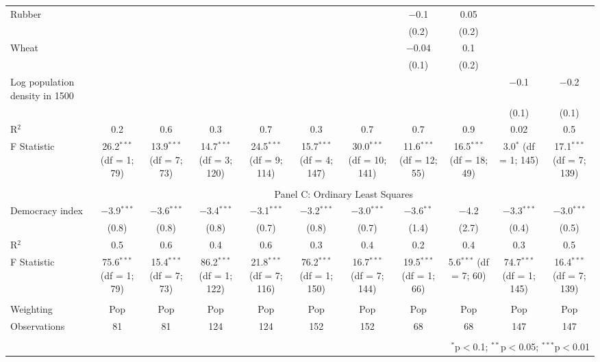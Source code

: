 {\begin{table}[]
\begin{threeparttable}
\begin{tabular}{@{\extracolsep{0pt}}lcccccccccc}
  Rubber &  &  &  &  &  &  & $-$0.1 & 0.05 &  &  \\ 
  &  &  &  &  &  &  & (0.2) & (0.2) &  &  \\ 
  Wheat &  &  &  &  &  &  & $-$0.04 & 0.1 &  &  \\ 
  &  &  &  &  &  &  & (0.1) & (0.2) &  &  \\ 
  Log population density in 1500 &  &  &  &  &  &  &  &  & $-$0.1 & $-$0.2 \\ 
  &  &  &  &  &  &  &  &  & (0.1) & (0.1) \\ 
  R$^{2}$ & 0.2 & 0.6 & 0.3 & 0.7 & 0.3 & 0.7 & 0.7 & 0.9 & 0.02 & 0.5 \\ 
F Statistic & 26.2$^{***}$ (df = 1; 79) & 13.9$^{***}$ (df = 7; 73) & 14.7$^{***}$ (df = 3; 120) & 24.5$^{***}$ (df = 9; 114) & 15.7$^{***}$ (df = 4; 147) & 30.0$^{***}$ (df = 10; 141) & 11.6$^{***}$ (df = 12; 55) & 16.5$^{***}$ (df = 18; 49) & 3.0$^{*}$ (df = 1; 145) & 17.1$^{***}$ (df = 7; 139) \\ 
\hline  \\[-1.8ex] 
   & \multicolumn{10}{c}{Panel C: Ordinary Least Squares} \\
Democracy index & $-$3.9$^{***}$ & $-$3.6$^{***}$ & $-$3.4$^{***}$ & $-$3.1$^{***}$ & $-$3.2$^{***}$ & $-$3.0$^{***}$ & $-$3.6$^{**}$ & $-$4.2 & $-$3.3$^{***}$ & $-$3.0$^{***}$ \\ 
  & (0.8) & (0.8) & (0.8) & (0.7) & (0.8) & (0.7) & (1.4) & (2.7) & (0.4) & (0.5) \\ 
R$^{2}$ & 0.5 & 0.6 & 0.4 & 0.6 & 0.3 & 0.4 & 0.2 & 0.4 & 0.3 & 0.5 \\ 
F Statistic & 75.6$^{***}$ (df = 1; 79) & 15.4$^{***}$ (df = 7; 73) & 86.2$^{***}$ (df = 1; 122) & 21.8$^{***}$ (df = 7; 116) & 76.2$^{***}$ (df = 1; 150) & 16.7$^{***}$ (df = 7; 144) & 19.5$^{***}$ (df = 1; 66) & 5.6$^{***}$ (df = 7; 60) & 74.7$^{***}$ (df = 1; 145) & 16.4$^{***}$ (df = 7; 139) \\ 
  \hline \\[-1.8ex] 
Weighting & Pop & Pop & Pop & Pop & Pop & Pop & Pop & Pop & Pop & Pop \\ 
Observations & 81 & 81 & 124 & 124 & 152 & 152 & 68 & 68 & 147 & 147 \\ 
\hline 
\hline \\[-1.8ex] 
  & \multicolumn{10}{r}{$^{*}$p$<$0.1; $^{**}$p$<$0.05; $^{***}$p$<$0.01} \\ 
\end{tabular}
\begin{tablenotes} 

\end{tablenotes}
\end{threeparttable}
\end{table}}
